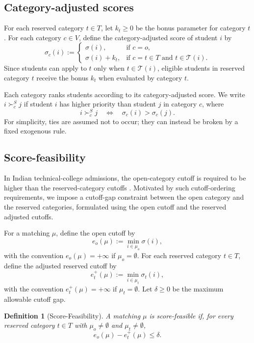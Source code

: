 \documentclass[10pt]{article}
\newtheorem{definition}{Definition}
\newcommand{\T}{\mathcal{T}}
\newcommand{\1}{\mathbf{1}}
\begin{document}
\subsection{Category-adjusted scores}

For each reserved category $t\in T$, let $k_t\ge 0$ be the bonus parameter for category $t$. For each category $c\in V$, define the category-adjusted score of student $i$ by
\[
\sigma_c(i)
:=
\begin{cases}
\sigma(i), & \text{if } c=o,\\[3pt]
\sigma(i)+k_t, & \text{if } c=t\in T \text{ and } t\in\T(i).
\end{cases}
\]
Since students can apply to $t$ only when $t\in\T(i)$, eligible students in reserved category $t$ receive the bonus $k_t$ when evaluated by category $t$.

Each category ranks students according to its category-adjusted score. We write $i\succ_c^S j$ if student $i$ has higher priority than student $j$ in category $c$, where
\[
i\succ_c^S j
\quad \Longleftrightarrow \quad
\sigma_c(i)>\sigma_c(j).
\]
For simplicity, ties are assumed not to occur; they can instead be broken by a fixed exogenous rule.

\subsection{Score-feasibility}

In Indian technical-college admissions, the open-category cutoff is required to be higher than the reserved-category cutoffs \citep{AyTu23a}. Motivated by such cutoff-ordering requirements, we impose a cutoff-gap constraint between the open category and the reserved categories, formulated using the open cutoff and the reserved adjusted cutoffs.

For a matching $\mu$, define the open cutoff by
\[
e_o(\mu):=\min_{i\in\mu_o}\sigma(i),
\]
with the convention $e_o(\mu)=+\infty$ if $\mu_o=\emptyset$. For each reserved category $t\in T$, define the adjusted reserved cutoff by
\[
e_t^+(\mu):=\min_{i\in\mu_t}\sigma_t(i),
\]
with the convention $e_t^+(\mu)=+\infty$ if $\mu_t=\emptyset$. Let $\delta\ge 0$ be the maximum allowable cutoff gap.

\begin{definition}[Score-Feasibility]
A matching $\mu$ is score-feasible if, for every reserved category $t\in T$ with $\mu_o\ne\emptyset$ and $\mu_t\ne\emptyset$,
\[
e_o(\mu)-e_t^+(\mu)\le \delta.
\]
\end{definition}
\end{document}
